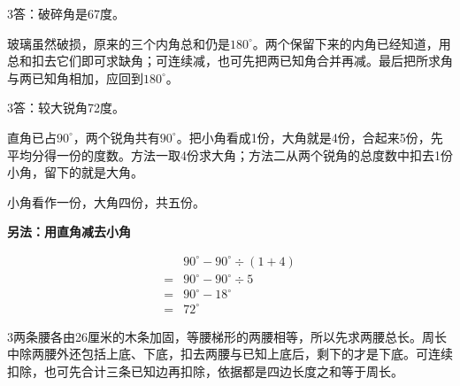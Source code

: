 \documentclass[multi=snippet,border={5bp 20bp 5bp 5bp}]{standalone}
\newenvironment{snippet}[3]{\begin{minipage}{#1bp}\color{answerred}\fontsize{#2}{#3}\selectfont\raggedright}{\end{minipage}}
\begin{document}
\begin{snippet}{505}{11.5}{14}\begin{multicols}{3}\raggedcolumns 答：破碎角是67度。\par 玻璃虽然破损，原来的三个内角总和仍是\(180^\circ\)\allowbreak 。两个保留下来的内角已经知道，用总和扣去它们即可求缺角；可连续减，也可先把两已知角合并再减。最后把所求角与两已知角相加，应回到\(180^\circ\)\allowbreak 。\end{multicols}\end{snippet}
\begin{snippet}{505}{11.5}{14}\begin{multicols}{3}\raggedcolumns 答：较大锐角72度。\par 直角已占\(90^\circ\)\allowbreak ，两个锐角共有\(90^\circ\)\allowbreak 。把小角看成1份，大角就是4份，合起来5份，先平均分得一份的度数。方法一取4份求大角；方法二从两个锐角的总度数中扣去1份小角，留下的就是大角。\par 小角看作一份，大角四份，共五份。\par \textbf{另法：用直角减去小角}\par \[\begin{aligned}&90^\circ-90^\circ\div(1+4)\\={}&90^\circ-90^\circ\div5\\={}&90^\circ-18^\circ\\={}&72^\circ\end{aligned}\]\end{multicols}\end{snippet}
\begin{snippet}{505}{11.5}{14}\begin{multicols}{3}\raggedcolumns 两条腰各由26厘米的木条加固，等腰梯形的两腰相等，所以先求两腰总长。周长中除两腰外还包括上底、下底，扣去两腰与已知上底后，剩下的才是下底。可连续扣除，也可先合计三条已知边再扣除，依据都是四边长度之和等于周长。\end{multicols}\end{snippet}
\end{document}

